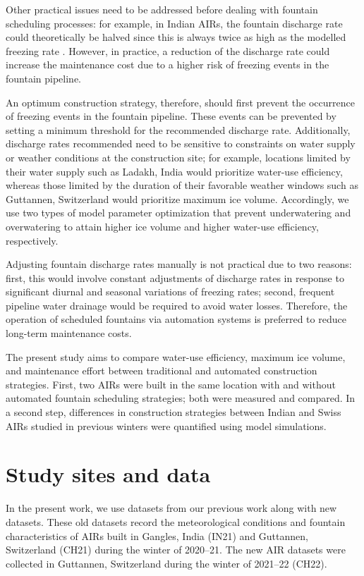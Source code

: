 \documentclass[tc, manuscript]{copernicus}
\begin{document}
Other practical issues need to be addressed before dealing with fountain scheduling processes:
for example, in Indian AIRs, the fountain discharge rate could theoretically be halved since this is
always twice as high as the modelled freezing rate
\citep{balasubramanianInfluenceMeteorologicalConditions2022}. However, in practice, a reduction of the discharge rate
could increase the maintenance cost due to a higher risk of freezing events in the fountain pipeline.

An optimum construction strategy, therefore, should first prevent the occurrence of freezing events in the
fountain pipeline. These events can be prevented by setting a minimum threshold for the recommended discharge
rate. Additionally, discharge rates recommended need to be sensitive to constraints on water supply or
weather conditions at the construction site; for example, locations limited by their water supply such as Ladakh, India
would prioritize water-use efficiency, whereas those limited by the duration of their favorable weather windows
such as Guttannen, Switzerland would prioritize maximum ice volume. Accordingly, we use two types of model
parameter optimization that prevent underwatering and overwatering to attain higher ice volume and higher
water-use efficiency, respectively.

Adjusting fountain discharge rates manually is not practical due to two reasons: first, this would
involve constant adjustments of discharge rates in response to significant diurnal and seasonal variations
of freezing rates; second, frequent pipeline water drainage would be required to avoid water losses. Therefore,
the operation of scheduled fountains via automation systems is preferred to reduce long-term maintenance costs.

The present study aims to compare water-use efficiency, maximum ice volume, and
maintenance effort between traditional and automated construction strategies. First, two AIRs were
built in the same location with and without automated fountain scheduling strategies; both were measured and
compared. In a second step, differences in construction strategies between Indian and Swiss
AIRs studied in previous winters were quantified using model simulations. 

\section{Study sites and data}

In the present work, we use datasets from our previous work
\citep{balasubramanianInfluenceMeteorologicalConditions2022} along with new datasets. These old datasets record
the meteorological conditions and fountain characteristics of AIRs built in Gangles, India (IN21) and Guttannen,
Switzerland (CH21) during the winter of 2020--21. The new AIR datasets
were collected in Guttannen, Switzerland during the winter of 2021--22 (CH22).
\end{document}
